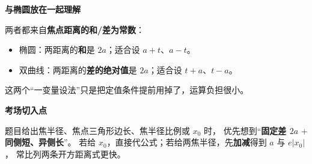 \begin{explanationbox}
\medskip
\textbf{\textcolor{CExplanation}{与椭圆放在一起理解}}

两者都来自\textbf{焦点距离的和/差为常数}：
\begin{itemize}[leftmargin=*,itemsep=0.3em,topsep=0.3em]
 \item 椭圆：两距离的\textbf{和}是 $2a$；适合设 $a+t$、$a-t$。
 \item 双曲线：两距离的\textbf{差的绝对值}是 $2a$；适合设 $t+a$、$t-a$。
\end{itemize}
这两个“一变量设法”只是把定值条件提前用掉了，运算负担很小。

\medskip
\textbf{\textcolor{CExplanation}{考场切入点}}

题目给出焦半径、焦点三角形边长、焦半径比例或 $x_0$ 时，
优先想到“\textbf{固定差 $2a$} + \textbf{同侧短、异侧长}”。
若给 $x_0$，直接代公式；若给两焦半径，先\textbf{加减}得到 $a$ 与 $e|x_0|$，
常比列两条开方距离式更快。

\end{explanationbox}

